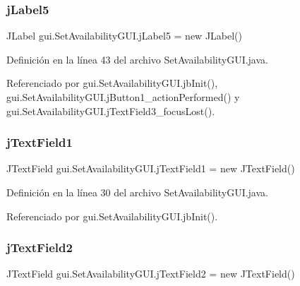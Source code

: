 \subsubsection{\texorpdfstring{jLabel5}{jLabel5}}
{\footnotesize\ttfamily J\+Label gui.\+Set\+Availability\+G\+U\+I.\+j\+Label5 = new J\+Label()\hspace{0.3cm}{\ttfamily [private]}}



Definición en la línea 43 del archivo Set\+Availability\+G\+U\+I.\+java.



Referenciado por gui.\+Set\+Availability\+G\+U\+I.\+jb\+Init(), gui.\+Set\+Availability\+G\+U\+I.\+j\+Button1\+\_\+action\+Performed() y gui.\+Set\+Availability\+G\+U\+I.\+j\+Text\+Field3\+\_\+focus\+Lost().

\mbox{\label{classgui_1_1_set_availability_g_u_i_a6e664193569e01789e9ccc37fa132c2a}} 
\subsubsection{\texorpdfstring{jTextField1}{jTextField1}}
{\footnotesize\ttfamily J\+Text\+Field gui.\+Set\+Availability\+G\+U\+I.\+j\+Text\+Field1 = new J\+Text\+Field()\hspace{0.3cm}{\ttfamily [private]}}



Definición en la línea 30 del archivo Set\+Availability\+G\+U\+I.\+java.



Referenciado por gui.\+Set\+Availability\+G\+U\+I.\+jb\+Init().

\mbox{\label{classgui_1_1_set_availability_g_u_i_aa31fe6946000ac1d5a01e7beb2ed4c84}} 
\subsubsection{\texorpdfstring{jTextField2}{jTextField2}}
{\footnotesize\ttfamily J\+Text\+Field gui.\+Set\+Availability\+G\+U\+I.\+j\+Text\+Field2 = new J\+Text\+Field()\hspace{0.3cm}{\ttfamily [private]}}



